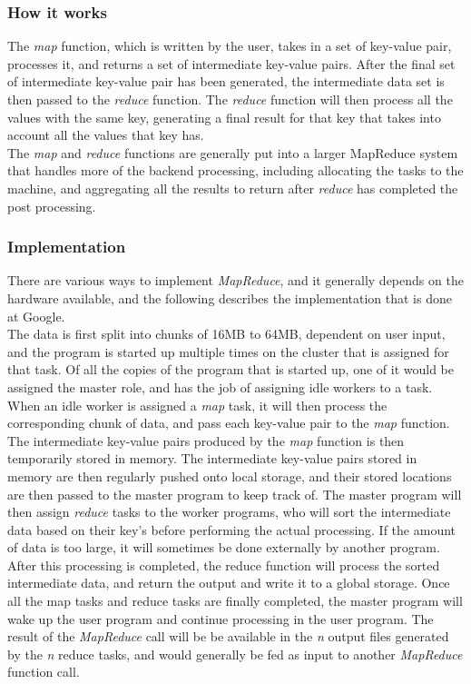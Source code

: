 \documentclass[]{article}
\begin{document}
\subsubsection{How it works}
The \emph{map} function, which is written by the user, takes in a set of key-value pair, processes it, and returns a set of intermediate key-value pairs. After the final set of intermediate key-value pair has been generated, the intermediate data set is then passed to the \emph{reduce} function. The \emph{reduce} function will then process all the values with the same key, generating a final result for that key that takes into account all the values that key has.\\

The \emph{map} and \emph{reduce} functions are generally put into a larger MapReduce system that handles more of the backend processing, including allocating the tasks to the machine, and aggregating all the results to return after \emph{reduce} has completed the post processing.\\


\subsubsection{Implementation}
There are various ways to implement \emph{MapReduce}, and it generally depends on the hardware available, and the following describes the implementation that is done at Google.\\

The data is first split into chunks of 16MB to 64MB, dependent on user input, and the program is started up multiple times on the cluster that is assigned for that task. Of all the copies of the program that is started up, one of it would be assigned the master role, and has the job of assigning idle workers to a task. When an idle worker is assigned a \emph{map} task, it will then process the corresponding chunk of data, and pass each key-value pair to the \emph{map} function. The intermediate key-value pairs produced by the \emph{map} function is then temporarily stored in memory. The intermediate key-value pairs stored in memory are then regularly pushed onto local storage, and their stored locations are then passed to the master program to keep track of. The master program will then assign \emph{reduce} tasks to the worker programs, who will sort the intermediate data based on their key's before performing the actual processing. If the amount of data is too large, it will sometimes be done externally by another program. After this processing is completed, the reduce function will process the sorted intermediate data, and return the output and write it to a global storage. Once all the map tasks and reduce tasks are finally completed, the master program will wake up the user program and continue processing in the user program. The result of the \emph{MapReduce} call will be be available in the \emph{n} output files generated by the \emph{n} reduce tasks, and would generally be fed as input to another \emph{MapReduce} function call.\\
\end{document}
